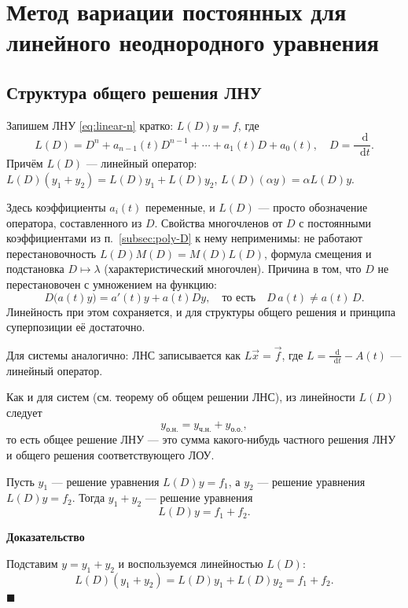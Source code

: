 \documentclass[12pt,a4paper]{article}
\numberwithin{equation}{section}
\newcommand{\vect}[1]{\vec{#1}}
\newcommand{\dd}{\mathop{}\!\mathrm{d}}
\renewenvironment{proof}[1][Доказательство]{\begin{center}\textbf{#1}\end{center}}{\hfill$\blacksquare$\par}
\begin{document}
\section[Вариация постоянных для ЛНУ]{Метод вариации постоянных для линейного неоднородного уравнения}
\label{sec:variation}

\subsection{Структура общего решения ЛНУ}

Запишем ЛНУ \eqref{eq:linear-n} кратко: \(L(D)y=f\), где
\[
L(D)=D^n+a_{n-1}(t)D^{n-1}+\cdots+a_1(t)D+a_0(t),\quad D=\frac{\dd}{\dd t}.
\]
Причём \(L(D)\) --- линейный оператор: \(L(D)(y_1+y_2)=L(D)y_1+L(D)y_2\), \(L(D)(\alpha y)=\alpha L(D)y\).

\label{rem:LD-variable}
\begin{remarkHSE}
Здесь коэффициенты \(a_i(t)\) переменные, и \(L(D)\) --- просто обозначение оператора, составленного из \(D\). Свойства многочленов от \(D\) с постоянными коэффициентами из п.~\ref{subsec:poly-D} к нему неприменимы: не работают перестановочность \(L(D)M(D)=M(D)L(D)\), формула смещения и подстановка \(D\mapsto\lambda\) (характеристический многочлен). Причина в том, что \(D\) не перестановочен с умножением на функцию:
\[
D\bigl(a(t)y\bigr)=a'(t)y+a(t)Dy,\quad\text{то есть}\quad D\,a(t)\neq a(t)\,D.
\]
Линейность при этом сохраняется, и для структуры общего решения и принципа суперпозиции её достаточно.
\end{remarkHSE}

Для системы аналогично: ЛНС записывается как \(L\vect{x}=\vect{f}\), где \({L=\frac{\dd}{\dd t}-A(t)}\) --- линейный оператор.

Как и для систем (см. теорему об общем решении ЛНС), из линейности \(L(D)\) следует
\[
y_{\text{о.н.}}=y_{\text{ч.н.}}+y_{\text{о.о.}},
\]
то есть общее решение ЛНУ --- это сумма какого-нибудь частного решения ЛНУ и общего решения соответствующего ЛОУ.

\begin{theoremHSE}
Пусть \(y_1\) --- решение уравнения \(L(D)y=f_1\), а \(y_2\) --- решение уравнения \(L(D)y=f_2\). Тогда \(y_1+y_2\) --- решение уравнения
\[
L(D)y=f_1+f_2.
\]
\end{theoremHSE}

\begin{proof}
Подставим \(y=y_1+y_2\) и воспользуемся линейностью \(L(D)\):
\[
L(D)(y_1+y_2)=L(D)y_1+L(D)y_2=f_1+f_2.
\]
\end{proof}
\end{document}
